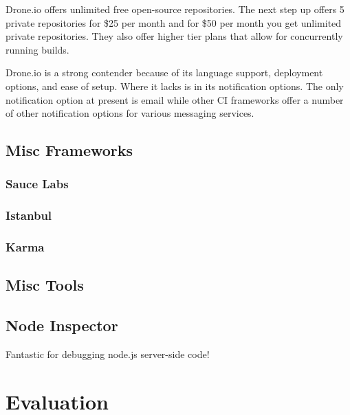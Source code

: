 \documentclass[11pt]{article}
\begin{document}
Drone.io offers unlimited free open-source repositories. The next step up offers 5 private repositories for \$25 per month and for \$50 per month you get unlimited private repositories. They also offer higher tier plans that allow for concurrently running builds.

Drone.io is a strong contender because of its language support, deployment options, and ease of setup. Where it lacks is in its notification options. The only notification option at present is email while other CI frameworks offer a number of other notification options for various messaging services.


\subsection{Misc Frameworks}
\subsubsection{Sauce Labs}


\subsubsection{Istanbul}


\subsubsection{Karma}



\subsection{Misc Tools}
\subsection{Node Inspector}
Fantastic for debugging node.js server-side code!


\section{Evaluation}


\end{document}
